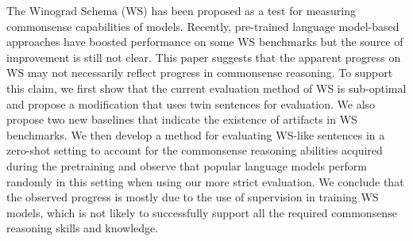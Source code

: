 The Winograd Schema (WS) has been proposed as a test for measuring commonsense capabilities of models. Recently, pre-trained language model-based approaches have boosted performance on some WS benchmarks but the source of improvement is still not clear.  This paper suggests that the apparent progress on WS may not necessarily reflect progress in commonsense reasoning. To support this claim, we first show that the current evaluation method of WS is sub-optimal and propose a modification that uses twin sentences for evaluation. We also propose two new baselines that indicate the existence of artifacts in WS benchmarks. We then develop a method for evaluating WS-like sentences in a zero-shot setting to account for the commonsense reasoning abilities acquired during the pretraining and observe that popular language models perform randomly in this setting when using our more strict evaluation. We conclude that the observed progress is mostly due to the use of supervision in training WS models, which is not likely to successfully support all the required commonsense reasoning skills and knowledge.
